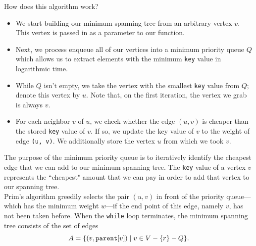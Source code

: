How does this algorithm work?

\begin{itemize}
    \item We start building our minimum spanning tree from an arbitrary vertex $v$. This vertex is passed in as a parameter to our function.
    \item Next, we process enqueue all of our vertices into a minimum priority queue $Q$ which allows us to extract elements with the minimum \verb!key! value in logarithmic time. 
    \item While $Q$ isn't empty, we take the vertex with the smallest \verb!key! value from $Q$; denote this vertex by $u$. Note that, on the first iteration, the vertex we grab is always $v$. 
    \item For each neighbor $v$ of $u$, we check whether the edge $(u, v)$ is cheaper than the stored \verb!key! value of $v$. If so, we update the key value of $v$ to the weight of edge \verb!(u, v)!. We additionally store the vertex $u$ from which we took $v$. 
\end{itemize}

The purpose of the minimum priority queue is to iteratively identify the cheapest edge that we can add to our minimum spanning tree. The \verb!key! value of a vertex $v$ represents the ``cheapest" amount that we can pay in order to add that vertex to our spanning tree. \\

Prim's algorithm greedily selects the pair $(u, v)$ in front of the priority queue---which has the minimum weight $w$---if the end point of this edge, namely $v$, has not been taken before. When the \verb!while! loop terminates, the minimum spanning tree consists of the set of edges
\[
A = \{(v, \verb!parent![v]) \mid v\in V - \{r\} - Q\}.
\]